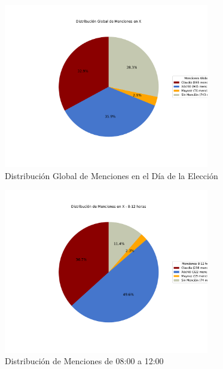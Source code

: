 \documentclass[10pt, a4paper]{article}
\begin{document}
	
	\newpage
	\begin{figure}[h!]
		\centering
		\includegraphics[width=0.8\textwidth]{grafica_global_x.pdf} %
		\vspace{-15mm}
		\caption{Distribución Global de Menciones en el Día de la Elección}
		\label{fig:globalDiaEleccion} %
	\end{figure}
	
	\begin{figure}[h!]
		\centering
		\includegraphics[width=0.8\textwidth]{grafica_intervalo_8-12.pdf} %
		\vspace{-15mm}
		\caption{Distribución de Menciones de 08:00 a 12:00}
		\label{fig:xIntervalo812} %
	\end{figure}
	
\end{document}
